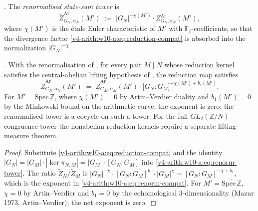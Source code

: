 \begin{definition}
\label{v4-arith:w10-a:def:renorm-tower}
\ClaimStatusDefinitional. The \emph{renormalised state-sum tower}
is
\begin{equation}
\label{v4-arith:w10-a:eq:renorm-tower}
\widetilde Z^{\mathrm{Ar}}_{G_{N},\alpha_{N}}(M')
\;:=\;
\bigl|G_{N}\bigr|^{-\chi(M')}\cdot
Z^{\mathrm{Ar}}_{G_{N},\alpha_{N}}(M'),
\end{equation}
where \(\chi(M')\) is the \'etale Euler characteristic of \(M'\) with
\(\mathbb F_{\ell}\)-coefficients, so that the divergence factor
\eqref{v4-arith:w10-a:eq:reduction-compat} is absorbed into the
normalization \(|G_{N}|^{-\chi}\).
\end{definition}

\begin{proposition}
\label{v4-arith:w10-a:prop:renorm-compat}
\ClaimStatusProvedHereConditional. With the renormalisation of
, for every pair \(M\mid N\)
whose reduction kernel satisfies the central-abelian lifting hypothesis
of , the reduction map satisfies
\begin{equation}
\label{v4-arith:w10-a:eq:renorm-compat}
\widetilde Z^{\mathrm{Ar}}_{G_{N},\alpha_{N}}(M')
\;=\;
\widetilde Z^{\mathrm{Ar}}_{G_{M},\alpha_{M}}(M')
\cdot \bigl[G_{N}:G_{M}\bigr]^{-\chi(M')+b_{1}(M')}.
\end{equation}
For \(M'=\overline{\mathrm{Spec}\,\mathbb Z}\), where \(\chi(M')=0\)
by Artin--Verdier duality and \(b_{1}(M')=0\) by the Minkowski bound
on the arithmetic curve, the exponent is zero: the renormalised tower
is a cocycle on such a tower. For the full
\(GL_{2}(\mathbb Z/N)\) congruence tower the nonabelian reduction
kernels require a separate lifting-measure theorem.
\end{proposition}

\begin{proof}
Substitute \eqref{v4-arith:w10-a:eq:reduction-compat} and the
identity
\(|G_{N}|=|G_{M}|\cdot|\ker\pi_{N,M}|=|G_{M}|\cdot[G_{N}:G_{M}]\)
into \eqref{v4-arith:w10-a:eq:renorm-tower}. The ratio
\(\widetilde Z_{N}/\widetilde Z_{M}\) is
\(|G_{N}|^{-\chi}\cdot[G_{N}:G_{M}]^{b_{1}}\cdot|G_{M}|^{\chi}
=[G_{N}:G_{M}]^{-\chi+b_{1}}\),
which is the exponent in \eqref{v4-arith:w10-a:eq:renorm-compat}.
For \(M'=\overline{\mathrm{Spec}\,\mathbb Z}\), \(\chi=0\) by
Artin--Verdier and \(b_{1}=0\) by the cohomological
3-dimensionality (Mazur 1973, Artin--Verdier); the net exponent is
zero.
\end{proof}

